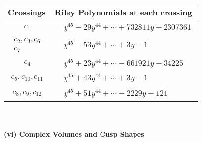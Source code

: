 \documentclass[1p]{elsarticle_modified}
\theoremstyle{definition}
\begin{document}
\begin{tabular}{m{50pt}|m{274pt}}
Crossings & \hspace{64pt}Riley Polynomials at each crossing \\
\hline $$\begin{aligned}c_{1}\end{aligned}$$&$\begin{aligned}
&y^{45}-29 y^{44}+\cdots+732811 y-2307361
\end{aligned}$\\
\hline $$\begin{aligned}c_{2},c_{3},c_{6}\\c_{7}\end{aligned}$$&$\begin{aligned}
&y^{45}-53 y^{44}+\cdots+3 y-1
\end{aligned}$\\
\hline $$\begin{aligned}c_{4}\end{aligned}$$&$\begin{aligned}
&y^{45}+23 y^{44}+\cdots-661921 y-34225
\end{aligned}$\\
\hline $$\begin{aligned}c_{5},c_{10},c_{11}\end{aligned}$$&$\begin{aligned}
&y^{45}+43 y^{44}+\cdots+3 y-1
\end{aligned}$\\
\hline $$\begin{aligned}c_{8},c_{9},c_{12}\end{aligned}$$&$\begin{aligned}
&y^{45}+51 y^{44}+\cdots-2229 y-121
\end{aligned}$\\
\hline
\end{tabular}\\~\\
\newpage\flushleft \textbf{(vi) Complex Volumes and Cusp Shapes}
\end{document}
